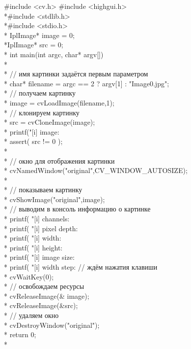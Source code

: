 \documentclass[a4paper,12pt]{article}
\begin{document}
\#include <cv.h>
\#include <highgui.h>
\\*\#include <stdlib.h>
\\*\#include <stdio.h>\\*
IplImage* image = 0;
\\*IplImage* src = 0;\\*
int main(int argc, char* argv[])
\\*{
\\*        // имя картинки задаётся первым параметром
\\*        char* filename = argc == 2 ? argv[1] : "Image0.jpg";
\\*        // получаем картинку
\\*        image = cvLoadImage(filename,1);
\\*        // клонируем картинку 
\\*        src = cvCloneImage(image);\\*
        printf("[i] image: %
\\*        assert( src != 0 );
\\*
\\*        // окно для отображения картинки
\\*        cvNamedWindow("original",CV\_WINDOW\_AUTOSIZE);
\\*
\\*        // показываем картинку
\\*        cvShowImage("original",image);\\*
        // выводим в консоль информацию о картинке
\\*        printf( "[i] channels:  %
\\*        printf( "[i] pixel depth: %
\\*        printf( "[i] width:       %
\\*        printf( "[i] height:      %
\\*        printf( "[i] image size:  %
\\*        printf( "[i] width step:  %
        // ждём нажатия клавиши
\\*        cvWaitKey(0);\\*
        // освобождаем ресурсы
\\*        cvReleaseImage(\& image);
\\*        cvReleaseImage(\&src);
\\*        // удаляем окно
\\*        cvDestroyWindow("original");
\\*        return 0;
\\*}
\end{document}

